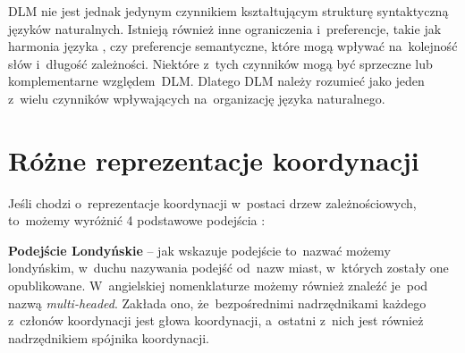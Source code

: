 \documentclass[licencjacka]{pracamgr_Kogni}
\begin{document}
DLM nie jest jednak jedynym czynnikiem kształtującym strukturę syntaktyczną języków naturalnych. Istnieją również inne ograniczenia i~preferencje, takie jak harmonia języka \citep{Jing2022}, czy preferencje semantyczne, które mogą wpływać na~kolejność słów i~długość zależności. Niektóre z~tych czynników mogą być sprzeczne lub komplementarne względem~DLM. Dlatego DLM należy rozumieć jako jeden z~wielu czynników wpływających na~organizację języka naturalnego.

\section{Różne reprezentacje koordynacji}
Jeśli chodzi o~reprezentacje koordynacji w~postaci drzew zależnościowych, to~możemy wyróżnić 4 podstawowe podejścia \citep{Przepiorkowski2023, PopelEtAl2013}:\\

\textbf{Podejście Londyńskie} -- jak wskazuje \citet{Przepiorkowski2023} podejście to~nazwać możemy londyńskim, w~duchu nazywania podejść od~nazw miast, w~których zostały one opublikowane. W~angielskiej nomenklaturze możemy również znaleźć je~pod nazwą \textit{multi-headed}. Zakłada ono, że~bezpośrednimi nadrzędnikami każdego z~członów koordynacji jest głowa koordynacji, a~ostatni z~nich jest również nadrzędnikiem spójnika koordynacji.
\end{document}
